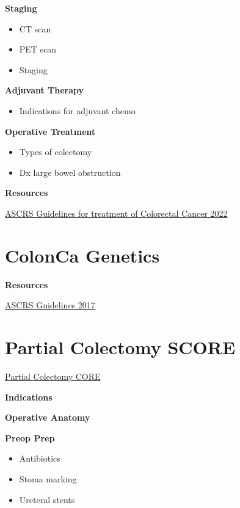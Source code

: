 \documentclass[
]{book}
\providecommand{\tightlist}{%
  \setlength{\itemsep}{0pt}\setlength{\parskip}{0pt}}
\begin{document}
\textbf{Staging}

\begin{itemize}
\tightlist
\item
  CT scan
\item
  PET scan
\item
  Staging
\end{itemize}

\textbf{Adjuvant Therapy}

\begin{itemize}
\tightlist
\item
  Indications for adjuvant chemo
\end{itemize}

\textbf{Operative Treatment}

\begin{itemize}
\tightlist
\item
  Types of colectomy
\item
  Dx large bowel obstruction
\end{itemize}

\textbf{Resources}

\href{https://fascrs.org/ascrs/media/files/downloads/2022-Colon-Cancer-CPG.pdf}{ASCRS Guidelines for treatment of Colorectal Cancer 2022}

\hypertarget{ColonGenetics}{%
\chapter{ColonCa Genetics}\label{ColonGenetics}}

\textbf{Resources}

\href{https://fascrs.org/ascrs/media/files/downloads/Clinical\%20Practice\%20Guidelines/cpg_for_the_surgical_treatment_of_patients_with_lynch_syndrome_feb_2017_dcr_issue.pdf}{ASCRS Guidelines 2017}

\hypertarget{PColectomyObj}{%
\chapter{Partial Colectomy SCORE}\label{PColectomyObj}}

\href{https://www.surgicalcore.org/modulecontent.aspx?id=129670}{Partial Colectomy CORE}

\textbf{Indications}

\textbf{Operative Anatomy}

\textbf{Preop Prep}

\begin{itemize}
\tightlist
\item
  Antibiotics
\item
  Stoma marking
\item
  Ureteral stents
\end{itemize}
\end{document}
